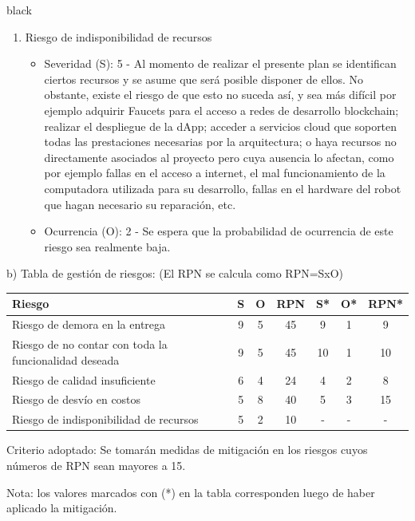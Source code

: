 \documentclass[
11pt, %
]{charter}
\begin{document}
\begin{consigna}{black}
\begin{enumerate}
\item Riesgo de indisponibilidad de recursos
\begin{itemize}
	\item Severidad (S): 5 - Al momento de realizar el presente plan se identifican ciertos recursos y se asume que será posible disponer de ellos. No obstante, existe el riesgo de que esto no suceda así, y sea más difícil por ejemplo adquirir Faucets para el acceso a redes de desarrollo blockchain; realizar el despliegue de la dApp; acceder a servicios cloud que soporten todas las prestaciones necesarias por la arquitectura; o haya recursos no directamente asociados al proyecto pero cuya ausencia lo afectan, como por ejemplo fallas en el acceso a internet, el mal funcionamiento de la computadora utilizada para su desarrollo, fallas en el hardware del robot que hagan necesario su reparación, etc.
	\item Ocurrencia (O): 2 - Se espera que la probabilidad de ocurrencia de este riesgo sea realmente baja.
\end{itemize}

\end{enumerate}

b) Tabla de gestión de riesgos:      (El RPN se calcula como RPN=SxO)

\begin{table}[htpb]
\centering
\begin{tabularx}{\linewidth}{@{}|X|c|c|c|c|c|c|@{}}
\hline
\rowcolor[HTML]{C0C0C0}
Riesgo 													& S & O & RPN & S* & O* & RPN* \\ \hline
Riesgo de demora en la entrega							& 9 & 5 & 45 &	9  &  1  & 9    \\ \hline
Riesgo de no contar con toda la funcionalidad deseada		& 9 & 5 & 45 & 	10  & 1 &  10    \\ \hline
Riesgo de calidad insuficiente							& 6 & 4 & 24 &  	4 &  2 &   8  \\ \hline
Riesgo de desvío en costos								& 5 & 8 & 40 & 	5  & 3  &  15   \\ \hline
Riesgo de indisponibilidad de recursos					& 5 & 2 & 10 & 	-  & -  &   -   \\ \hline
\end{tabularx}%
\end{table}

Criterio adoptado:
Se tomarán medidas de mitigación en los riesgos cuyos números de RPN sean mayores a 15.

Nota: los valores marcados con (*) en la tabla corresponden luego de haber aplicado la mitigación.


\end{consigna}
\end{document}
